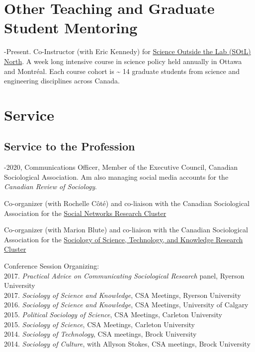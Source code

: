 \section{Other Teaching and Graduate Student
Mentoring}\label{other-teaching-and-graduate-student-mentoring}

-Present. Co-Instructor (with Eric Kennedy) for
\href{http://sotlnorth.ca}{Science Outside the Lab (SOtL) North}. A week
long intensive course in science policy held annually in Ottawa and
Montréal. Each course cohort is \textasciitilde{} 14 graduate students
from science and engineering disciplines across Canada.

\section{Service}\label{service}

\subsection{Service to the Profession}\label{service-to-the-profession}

-2020, Communications Officer, Member of the Executive Council,
Canadian Sociological Association. Am also managing social media
accounts for the \emph{Canadian Review of Sociology}.

\ind Co-organizer (with Rochelle Côté) and co-liaison with the Canadian
Sociological Association for the
\href{http://www.csa-scs.ca/files/webapps/csapress/socnet/}{Social
Networks Research Cluster}

\ind Co-organizer (with Marion Blute) and co-liaison with the Canadian
Sociological Association for the
\href{http://www.csa-scs.ca/files/webapps/csapress/sstk/}{Sociology of
Science, Technology, and Knowledge Research Cluster}

\ind Conference Session Organizing:\\
2017. \emph{Practical Advice on Communicating Sociological Research}
panel, Ryerson University\\
2017. \emph{Sociology of Science and Knowledge}, CSA Meetings, Ryerson
University\\
2016. \emph{Sociology of Science and Knowledge}, CSA Meetings,
University of Calgary\\
2015. \emph{Political Sociology of Science}, CSA Meetings, Carleton
University\\
2015. \emph{Sociology of Science}, CSA Meetings, Carleton University\\
2014. \emph{Sociology of Technology}, CSA meetings, Brock University\\
2014. \emph{Sociology of Culture}, with Allyson Stokes, CSA meetings,
Brock University

